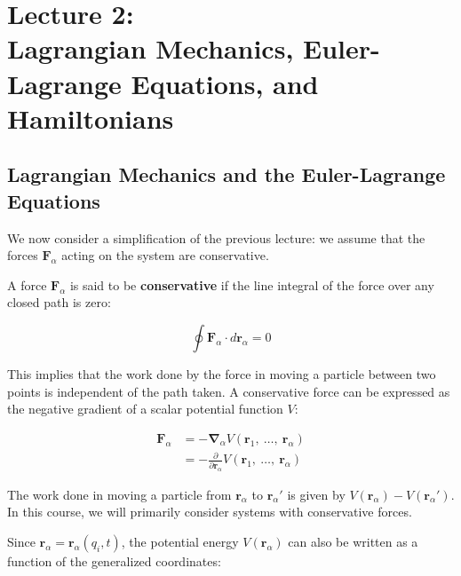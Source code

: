 \section[Lecture 2: Lagrangian Mechanics, Euler-Lagrange Equations, and Hamiltonians]
{\texorpdfstring{Lecture 2:\\ Lagrangian Mechanics, Euler-Lagrange Equations, and Hamiltonians}
{Lecture 2: Lagrangian Mechanics, Euler-Lagrange Equations, and Hamiltonians}}

\subsection{Lagrangian Mechanics and the Euler-Lagrange Equations}

We now consider a simplification of the previous lecture: we assume that the forces 
$\mathbf{F}_\alpha$ acting on the system are conservative.

\begin{definition}
A force $\mathbf{F}_\alpha$ is said to be \textbf{conservative} if the line integral of 
the force over any closed path is zero:

\begin{equation}
    \oint \mathbf{F}_\alpha \cdot d\mathbf{r}_\alpha = 0
\end{equation}

\end{definition}

This implies that the work done by the force in moving a particle between two points is 
independent of the path taken.  A conservative force can be expressed as the negative 
gradient of a scalar potential function $V$:

\begin{align}
    \mathbf{F}_\alpha &= -\mathbf{\nabla}_\alpha V(\mathbf{r}_1,\ \dots,\ \mathbf{r}_\alpha) \\
    &= - \frac{\partial}{\partial \mathbf{r}_\alpha} V(\mathbf{r}_1,\ \dots,\ \mathbf{r}_\alpha)
\end{align}

The work done in moving a particle from $\mathbf{r}_\alpha$ to $\mathbf{r}_\alpha'$ is 
given by $V(\mathbf{r}_\alpha) - V(\mathbf{r}_\alpha')$. In this course, we will 
primarily consider systems with conservative forces.

Since $\mathbf{r}_\alpha=\mathbf{r}_\alpha(q_i, t)$, the potential energy 
$V(\mathbf{r}_\alpha)$ can also be written as a function of the generalized coordinates:

